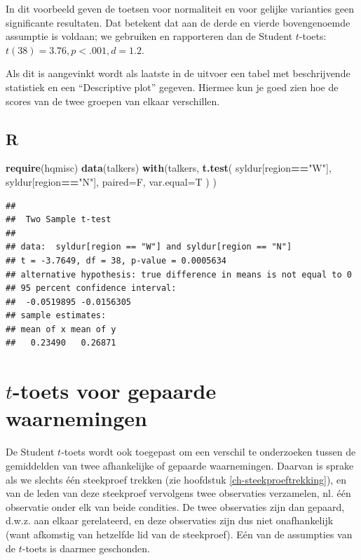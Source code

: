 \documentclass[
]{book}
\newenvironment{Shaded}{\begin{snugshade}}{\end{snugshade}}
\newcommand{\AttributeTok}[1]{\textcolor[rgb]{0.13,0.29,0.53}{#1}}
\newcommand{\FunctionTok}[1]{\textcolor[rgb]{0.13,0.29,0.53}{\textbf{#1}}}
\newcommand{\NormalTok}[1]{#1}
\newcommand{\SpecialCharTok}[1]{\textcolor[rgb]{0.81,0.36,0.00}{\textbf{#1}}}
\newcommand{\StringTok}[1]{\textcolor[rgb]{0.31,0.60,0.02}{#1}}
\begin{document}
In dit voorbeeld geven de toetsen voor normaliteit en voor gelijke
varianties geen significante resultaten. Dat betekent dat aan de derde
en vierde bovengenoemde assumptie is voldaan; we gebruiken en
rapporteren dan de Student \(t\)-toets: \(t(38)=3.76, p<.001, d=1.2\).

Als dit is aangevinkt wordt als laatste in de uitvoer een tabel met
beschrijvende statistiek en een ``Descriptive plot'' gegeven. Hiermee kun
je goed zien hoe de scores van de twee groepen van elkaar verschillen.

\subsection{R}\label{sec:R-ttoets-ongepaard}

\begin{Shaded}
\begin{Highlighting}[]
\FunctionTok{require}\NormalTok{(hqmisc)}
\FunctionTok{data}\NormalTok{(talkers)}
\FunctionTok{with}\NormalTok{(talkers, }\FunctionTok{t.test}\NormalTok{( syldur[region}\SpecialCharTok{==}\StringTok{"W"}\NormalTok{], syldur[region}\SpecialCharTok{==}\StringTok{"N"}\NormalTok{], }
            \AttributeTok{paired=}\NormalTok{F, }\AttributeTok{var.equal=}\NormalTok{T ) )}
\end{Highlighting}
\end{Shaded}

\begin{verbatim}
## 
##  Two Sample t-test
## 
## data:  syldur[region == "W"] and syldur[region == "N"]
## t = -3.7649, df = 38, p-value = 0.0005634
## alternative hypothesis: true difference in means is not equal to 0
## 95 percent confidence interval:
##  -0.0519895 -0.0156305
## sample estimates:
## mean of x mean of y 
##   0.23490   0.26871
\end{verbatim}

\section{\texorpdfstring{\(t\)-toets voor gepaarde waarnemingen}{t-toets voor gepaarde waarnemingen}}\label{sec:ttoets-gepaard}

De Student \(t\)-toets wordt ook toegepast om een verschil te onderzoeken
tussen de gemiddelden van twee afhankelijke of gepaarde waarnemingen.
Daarvan is sprake als we slechts één steekproef trekken (zie hoofdstuk
\ref{ch-steekproeftrekking}), en van de leden van deze steekproef
vervolgens twee observaties verzamelen, nl. één observatie onder elk van
beide condities. De twee observaties zijn dan gepaard, d.w.z. aan elkaar
gerelateerd, en deze observaties zijn dus niet onafhankelijk (want
afkomstig van hetzelfde lid van de steekproef). Eén van de assumpties
van de \(t\)-toets is daarmee geschonden.
\end{document}
